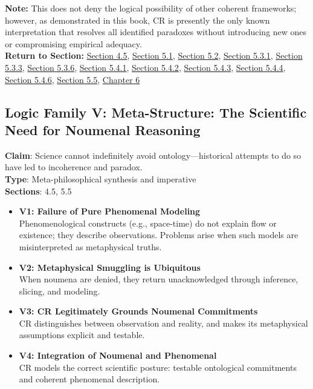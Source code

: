 \documentclass[12pt]{book}
\begin{document}
\textbf{Note:} This does not deny the logical possibility of other coherent frameworks; however, as demonstrated in this book, CR is presently the only known interpretation that resolves all identified paradoxes without introducing new ones or compromising empirical adequacy.\\
\textbf{Return to Section:} \hyperref[sec:4.5]{Section 4.5}, \hyperref[sec:5.1]{Section 5.1}, \hyperref[sec:5.2]{Section 5.2}, \hyperref[sec:5.3.1]{Section 5.3.1}, \hyperref[sec:5.3.3]{Section 5.3.3}, \hyperref[sec:5.3.6]{Section 5.3.6}, \hyperref[sec:5.4.1]{Section 5.4.1}, \hyperref[sec:5.4.2]{Section 5.4.2}, \hyperref[sec:5.4.3]{Section 5.4.3}, \hyperref[sec:5.4.4]{Section 5.4.4}, \hyperref[sec:5.4.6]{Section 5.4.6}, \hyperref[sec:5.5]{Section 5.5}, \hyperref[sec:6]{Chapter 6}

\vspace{1em}

\subsection*{Logic Family V: Meta-Structure: The Scientific Need for Noumenal Reasoning}
\textbf{Claim}: Science cannot indefinitely avoid ontology---historical attempts to do so have led to incoherence and paradox.\\
\textbf{Type}: Meta-philosophical synthesis and imperative\\
\textbf{Sections}: 4.5, 5.5
\begin{itemize}
  \item \textbf{V1: Failure of Pure Phenomenal Modeling} \\
  Phenomenological constructs (e.g., space-time) do not explain flow or existence; they describe observations. Problems arise when such models are misinterpreted as metaphysical truths.
  \item \textbf{V2: Metaphysical Smuggling is Ubiquitous} \\
  When noumena are denied, they return unacknowledged through inference, slicing, and modeling.
  \item \textbf{V3: CR Legitimately Grounds Noumenal Commitments} \\
  CR distinguishes between observation and reality, and makes its metaphysical assumptions explicit and testable.
  \item \textbf{V4: Integration of Noumenal and Phenomenal} \\
  CR models the correct scientific posture: testable ontological commitments and coherent phenomenal description.
\end{itemize}
\end{document}
